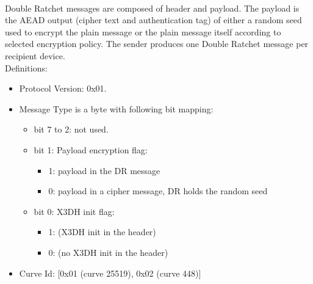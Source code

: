 \documentclass[a4paper,11pt]{article}
\begin{document}
    \paragraph*{}Double Ratchet messages are composed of header and payload. The payload is the AEAD output (cipher text and authentication tag) of either a random seed used to encrypt the plain message or the plain message itself according to selected encryption policy. The sender produces one Double Ratchet message per recipient device.\\
      Definitions:
      \begin{itemize}
      \item Protocol Version: 0x01.
      \item Message Type is a byte with following bit mapping:
        \begin{itemize}
          \item bit 7 to 2: not used.
          \item bit 1: Payload encryption flag:
            \begin{itemize}
              \item 1: payload in the DR message
              \item 0: payload in a cipher message, DR holds the random seed
            \end{itemize}
          \item bit 0: X3DH init flag:
            \begin{itemize}
              \item 1: (X3DH init in the header)
              \item 0: (no X3DH init in the header)
            \end{itemize}
        \end{itemize}
      \item Curve Id: [0x01 (curve 25519), 0x02 (curve 448)]
      \end{itemize}
\end{document}
